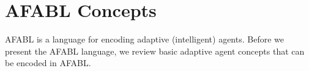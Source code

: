 \section{AFABL Concepts}

AFABL is a language for encoding adaptive (intelligent) agents. Before we present the AFABL language, we review basic adaptive agent concepts that can be encoded in AFABL.










